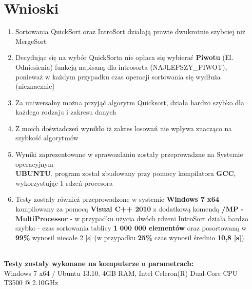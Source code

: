 \documentclass[12pt,a4paper,oneside]{article}
\begin{document}
\section{Wnioski}
\begin{enumerate}
\item Sortowania QuickSort oraz IntroSort działają prawie dwukrotnie szybciej niż MergeSort
\item Decydując się na wybór QuickSorta nie opłaca się wybierać \textbf{Piwotu} (El. Odniesienia) funkcją napisaną dla introsorta (NAJLEPSZY\_PIWOT), ponieważ w każdym przypadku czas operacji sortowania się wydłuża (nieznacznie)
\item Za uniwersalny można przyjąć algorytm Quicksort, działa bardzo szybko dla każdego rodzaju i zakresu danych
\item Z moich doświadczeń wynikło iż zakres losowań nie wpływa znacząco na szybkość algorytmów
\item Wyniki zaprezentowane w sprawozdaniu zostały przeprowadzne na Systemie operacyjnym \\\textbf{UBUNTU}, program został zbudowany przy pomocy kompilatora\textbf{ GCC}, wykorzystując 1 rdzeń procesora
\item Testy zostały również przeprowadzone w systemie \textbf{Windows 7 x64} - kompilowany za pomocą \textbf{Visual C++ 2010} z dodatkową komendą \textbf{/MP - MultiProcessor} - w przypadku użycia dwóch rdzeni IntroSort działa bardzo szybko - czas sortowania tablicy \textbf{1 000 000 elementów} oraz posortowaną w \textbf{99\%} wynosił niecałe 2 [s] (w przypadku \textbf{25\%} czas wynosił średnio \textbf{10,8 [s]})
\end{enumerate}
\begin{center}
\textbf{\\Testy zostały wykonane na komputerze o parametrach:}\\
Windows 7 x64 / Ubuntu 13.10, 4GB RAM, Intel Celeron(R) Dual-Core CPU T3500 @ 2.10GHz
\end{center}
\end{document}
